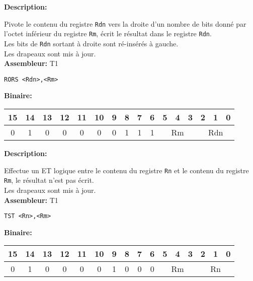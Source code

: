 \documentclass{article}
\newcounter{subsubsubsection}[subsubsection]
\begin{document}

\textbf{Description: }

Pivote le contenu du registre \texttt{Rdn} vers la droite d'un nombre de bits donné par l'octet inférieur du registre \texttt{Rm}, écrit le résultat dans le registre \texttt{Rdn}.\\
Les bits de \texttt{Rdn} sortant à droite sont ré-insérés à gauche.\\
Les drapeaux sont mis à jour.\\

\textbf{Assembleur:} T1

\begin{lstlisting}
RORS <Rdn>,<Rm>
\end{lstlisting}

\textbf{Binaire:}\\

\begin{tabular}{| c c c c c c c c c c c c c c c c |}
\hline
15 & 14 & 13 & 12 & 11 & 10 & \multicolumn{1}{|c}{9} & 8 & 7 & 6 & \multicolumn{1}{|c}{5} & 4 & 3 & \multicolumn{1}{|c}{2} & 1 & 0 \\
\hline
0 & 1 & 0 & 0 & 0 & 0 & \multicolumn{1}{|c}{0} & 1 & 1 & 1 & \multicolumn{3}{|c}{Rm} & \multicolumn{3}{|c|}{Rdn} \\
\hline
\end{tabular}



\textbf{Description: }

Effectue un ET logique entre le contenu du registre \texttt{Rn} et le contenu du registre \texttt{Rm}, le résultat n'est pas écrit.\\
Les drapeaux sont mis à jour.\\

\textbf{Assembleur:} T1

\begin{lstlisting}
TST <Rn>,<Rm>
\end{lstlisting}

\textbf{Binaire:}\\

\begin{tabular}{| c c c c c c c c c c c c c c c c |}
\hline
15 & 14 & 13 & 12 & 11 & 10 & \multicolumn{1}{|c}{9} & 8 & 7 & 6 & \multicolumn{1}{|c}{5} & 4 & 3 & \multicolumn{1}{|c}{2} & 1 & 0 \\
\hline
0 & 1 & 0 & 0 & 0 & 0 & \multicolumn{1}{|c}{1} & 0 & 0 & 0 & \multicolumn{3}{|c}{Rm} & \multicolumn{3}{|c|}{Rn} \\
\hline
\end{tabular}
\end{document}
